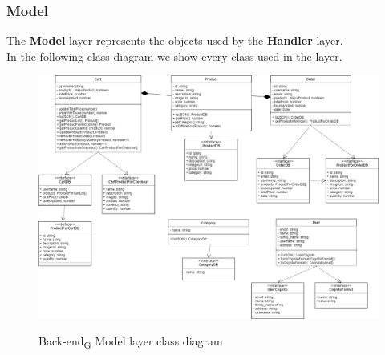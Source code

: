 \subsubsection{Model}
The \textbf{Model} layer represents the objects used by the \textbf{Handler} layer. \\
In the following class diagram we show every class used in the layer.

\begin{figure}[H]
\centering
\includegraphics[scale=0.40]{res/Architettura/Backend/img/diagrammaClassiBack-end}\\
\caption{Back-end\textsubscript{G} Model layer class diagram}
\end{figure}


